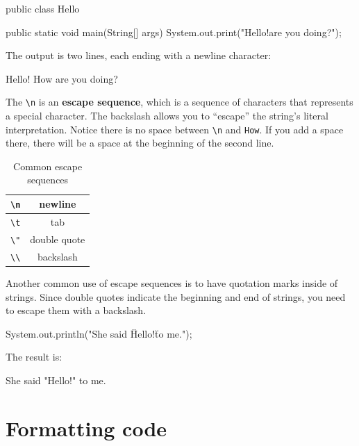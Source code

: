 \documentclass[12pt]{book}
\theoremstyle{exercise}
\begin{document}
\begin{code}
public class Hello {

    public static void main(String[] args) {
        System.out.print("Hello!\nHow are you doing?\n");
    }
}
\end{code}

The output is two lines, each ending with a newline character:

\begin{stdout}
Hello!
How are you doing?
\end{stdout}


The \verb"\n" is an {\bf escape sequence}, which is a sequence of characters that represents a special character.
The backslash allows you to ``escape'' the string's literal interpretation.
Notice there is no space between \verb"\n" and \verb"How".
If you add a space there, there will be a space at the beginning of the second line.

\begin{table}[!ht]
\begin{center}
\begin{tabular}{|c|c|}
\hline
\verb"\n" & newline \\
\hline
\verb"\t" & tab \\
\hline
\verb'\"' & double quote \\
\hline
\verb"\\" & backslash \\
\hline
\end{tabular}
\caption{Common escape sequences}
\end{center}
\end{table}


Another common use of escape sequences is to have quotation marks inside of strings.
Since double quotes indicate the beginning and end of strings, you need to escape them with a backslash.

\begin{code}
System.out.println("She said \"Hello!\" to me.");
\end{code}

The result is:

\begin{stdout}
She said "Hello!" to me.
\end{stdout}


\section{Formatting code}
\label{formatting}
\end{document}
